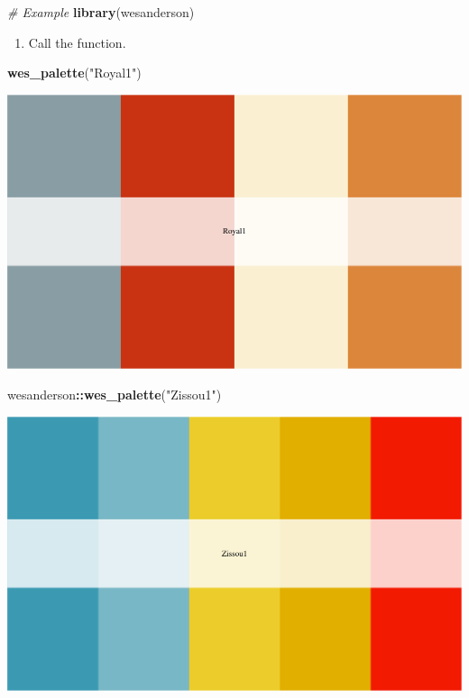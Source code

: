 \documentclass[
]{book}
\newenvironment{Shaded}{\begin{snugshade}}{\end{snugshade}}
\newcommand{\CommentTok}[1]{\textcolor[rgb]{0.56,0.35,0.01}{\textit{#1}}}
\newcommand{\KeywordTok}[1]{\textcolor[rgb]{0.13,0.29,0.53}{\textbf{#1}}}
\newcommand{\NormalTok}[1]{#1}
\newcommand{\OperatorTok}[1]{\textcolor[rgb]{0.81,0.36,0.00}{\textbf{#1}}}
\newcommand{\StringTok}[1]{\textcolor[rgb]{0.31,0.60,0.02}{#1}}
\providecommand{\tightlist}{%
  \setlength{\itemsep}{0pt}\setlength{\parskip}{0pt}}
\begin{document}
\begin{Shaded}
\begin{Highlighting}[]
\CommentTok{# Example}
\KeywordTok{library}\NormalTok{(wesanderson)}
\end{Highlighting}
\end{Shaded}

\begin{enumerate}
\def\labelenumi{\arabic{enumi}.}
\setcounter{enumi}{2}
\tightlist
\item
  Call the function.
\end{enumerate}

\begin{Shaded}
\begin{Highlighting}[]
\KeywordTok{wes_palette}\NormalTok{(}\StringTok{"Royal1"}\NormalTok{)}
\end{Highlighting}
\end{Shaded}

\includegraphics{figures/unnamed-chunk-134-1.pdf}

\begin{Shaded}
\begin{Highlighting}[]
\NormalTok{wesanderson}\OperatorTok{::}\KeywordTok{wes_palette}\NormalTok{(}\StringTok{"Zissou1"}\NormalTok{)}
\end{Highlighting}
\end{Shaded}

\includegraphics{figures/unnamed-chunk-134-2.pdf}
\end{document}
